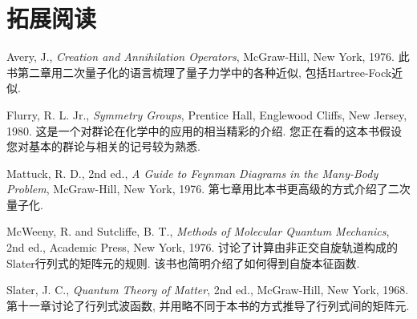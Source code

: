 
\theendnotes
{}
\section*{拓展阅读}

\indent Avery, J., \textit{Creation and Annihilation Operators}, McGraw-Hill, New York, 1976. 
此书第二章用二次量子化的语言梳理了量子力学中的各种近似, 包括Hartree-Fock近似.

Flurry, R. L. Jr., \textit{Symmetry Groups}, Prentice Hall, Englewood Cliffs, New Jersey, 1980. 
这是一个对群论在化学中的应用的相当精彩的介绍. 您正在看的这本书假设您对基本的群论与相关的记号较为熟悉.

Mattuck, R. D., 2nd ed., \textit{A Guide to Feynman Diagrams in the Many-Body Problem}, McGraw-Hill, New York, 1976. 
第七章用比本书更高级的方式介绍了二次量子化.

McWeeny, R. and Sutcliffe, B. T., \textit{Methods of Molecular Quantum Mechanics}, 2nd ed., Academic Press, New York, 1976. 
讨论了计算由非正交自旋轨道构成的Slater行列式的矩阵元的规则. 该书也简明介绍了如何得到自旋本征函数.

Slater, J. C., \textit{Quantum Theory of Matter}, 2nd ed., McGraw-Hill, New York, 1968. 
第十一章讨论了行列式波函数, 并用略不同于本书的方式推导了行列式间的矩阵元.
